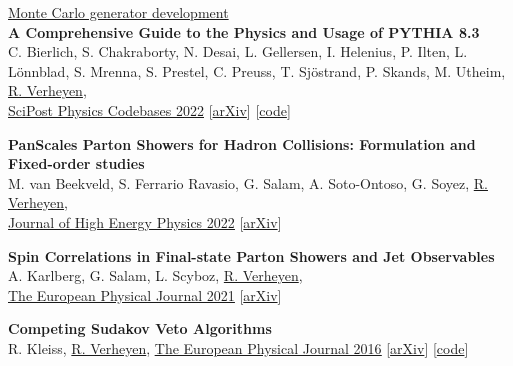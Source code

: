 \documentclass[a4paper,11pt]{article}
\begin{document}
\underline{\Large{Monte Carlo generator development}} \\[5pt]
\textbf{A Comprehensive Guide to the Physics and Usage of PYTHIA 8.3} \\
C. Bierlich, S. Chakraborty, N. Desai, L. Gellersen, I. Helenius, P. Ilten, L. Lönnblad, S. Mrenna, S. Prestel, C. Preuss, T. Sjöstrand, P. Skands, M. Utheim, \underline{R. Verheyen}, \\
\href{https://scipost.org/SciPostPhysCodeb.8-r8.3}{\underline{SciPost Physics Codebases 2022}} [\href{https://arxiv.org/abs/2203.11601}{arXiv}] [\href{https://pythia.org}{code}]

\textbf{PanScales Parton Showers for Hadron Collisions: Formulation and Fixed-order studies} \\
M. van Beekveld, S. Ferrario Ravasio, G. Salam, A. Soto-Ontoso, G. Soyez, \underline{R. Verheyen}, \\
\href{https://link.springer.com/article/10.1007/JHEP11(2022)019https://arxiv.org/abs/2205.02237}{\underline{Journal of High Energy Physics 2022}} [\href{https://arxiv.org/abs/2205.02237}{arXiv}]

\textbf{Spin Correlations in Final-state Parton Showers and Jet Observables} \\
A. Karlberg, G. Salam, L. Scyboz, \underline{R. Verheyen}, \\
\href{https://link.springer.com/article/10.1140/epjc/s10052-021-09378-0}{\underline{The European Physical Journal 2021}} [\href{https://arxiv.org/pdf/2103.16526.pdf}{arXiv}]

\textbf{Competing Sudakov Veto Algorithms} \\
R. Kleiss, \underline{R. Verheyen},
\href{https://link.springer.com/article/10.1140/epjc/s10052-016-4231-5}{\underline{The European Physical Journal 2016}} [\href{https://arxiv.org/pdf/1605.09246.pdf}{arXiv}] [\href{https://github.com/rbvh/Veto-Algorithm-Toy-Shower}{code}]



\end{document}
